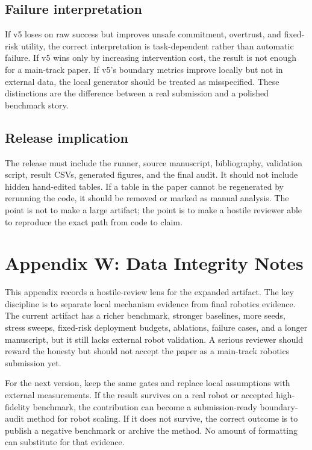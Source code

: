 \documentclass{article}
\begin{document}
\subsection{Failure interpretation}
If v5 loses on raw success but improves unsafe commitment, overtrust, and fixed-risk utility, the correct interpretation is task-dependent rather than automatic failure. If v5 wins only by increasing intervention cost, the result is not enough for a main-track paper. If v5's boundary metrics improve locally but not in external data, the local generator should be treated as misspecified. These distinctions are the difference between a real submission and a polished benchmark story.

\subsection{Release implication}
The release must include the runner, source manuscript, bibliography, validation script, result CSVs, generated figures, and the final audit. It should not include hidden hand-edited tables. If a table in the paper cannot be regenerated by rerunning the code, it should be removed or marked as manual analysis. The point is not to make a large artifact; the point is to make a hostile reviewer able to reproduce the exact path from code to claim.


\section{Appendix W: Data Integrity Notes}
This appendix records a hostile-review lens for the expanded artifact. The key discipline is to separate local mechanism evidence from final robotics evidence. The current artifact has a richer benchmark, stronger baselines, more seeds, stress sweeps, fixed-risk deployment budgets, ablations, failure cases, and a longer manuscript, but it still lacks external robot validation. A serious reviewer should reward the honesty but should not accept the paper as a main-track robotics submission yet.

For the next version, keep the same gates and replace local assumptions with external measurements. If the result survives on a real robot or accepted high-fidelity benchmark, the contribution can become a submission-ready boundary-audit method for robot scaling. If it does not survive, the correct outcome is to publish a negative benchmark or archive the method. No amount of formatting can substitute for that evidence.
\end{document}
